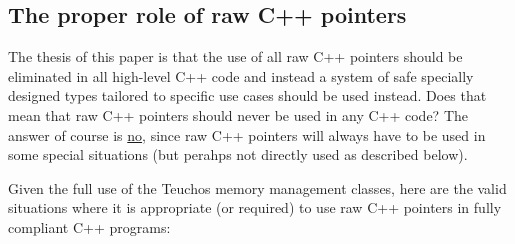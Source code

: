 \documentclass[pdf,ps2pdf,11pt]{SANDreport}
\begin{document}
%
{}\subsection{The proper role of raw C++ pointers}
\label{sec:role-of-raw-pointers}
%

The thesis of this paper is that the use of all raw C++ pointers should be
eliminated in all high-level C++ code and instead a system of safe specially
designed types tailored to specific use cases should be used instead.  Does
that mean that raw C++ pointers should never be used in any C++ code?  The
answer of course is {}\underline{no}, since raw C++ pointers will always have
to be used in some special situations (but perahps not directly used as
described below).

Given the full use of the Teuchos memory management classes, here are the
valid situations where it is appropriate (or required) to use raw C++ pointers
in fully compliant C++ programs:
\end{document}
